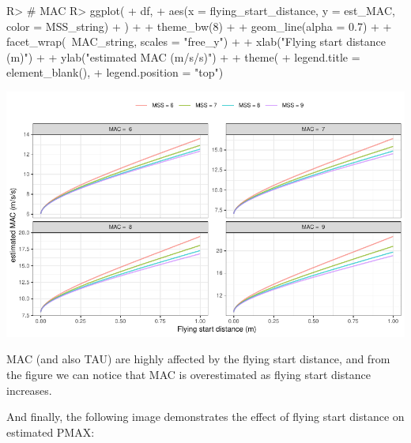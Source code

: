 \documentclass[
]{jss}
\begin{document}
\begin{CodeChunk}
\begin{CodeInput}
R> # MAC
R> ggplot(
+   df,
+   aes(x = flying_start_distance, y = est_MAC, color = MSS_string)
+ ) +
+   theme_bw(8) +
+   geom_line(alpha = 0.7) +
+   facet_wrap(~MAC_string, scales = "free_y") +
+   xlab("Flying start distance (m)") +
+   ylab("estimated MAC (m/s/s)") +
+   theme(
+     legend.title = element_blank(), 
+     legend.position = "top")
\end{CodeInput}


\begin{center}\includegraphics[width=1\linewidth]{paper_files/figure-latex/unnamed-chunk-25-1} \end{center}

\end{CodeChunk}

MAC (and also TAU) are highly affected by the flying start distance, and from the figure we can notice that MAC is overestimated as flying start distance increases.

And finally, the following image demonstrates the effect of flying start distance on estimated PMAX:
\end{document}
